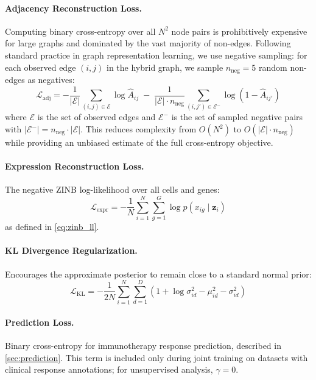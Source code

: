 \documentclass{article}
\newcommand{\KL}{\mathrm{KL}}
\begin{document}
\paragraph{Adjacency Reconstruction Loss.} Computing binary cross-entropy over all $N^2$ node pairs is prohibitively
expensive for large graphs and dominated by the vast majority of non-edges. Following standard practice in graph
representation learning, we use negative sampling: for each observed edge $(i,j)$ in the hybrid graph, we sample
$n_{\text{neg}} = 5$ random non-edges as negatives:
\begin{equation}
    \mathcal{L}_{\text{adj}} = -\frac{1}{|\mathcal{E}|} \sum_{(i,j) \in \mathcal{E}} \log \hat{A}_{ij} \;-\;
\frac{1}{|\mathcal{E}| \cdot n_{\text{neg}}} \sum_{(i,j') \in \mathcal{E}^{-}} \log(1 - \hat{A}_{ij'})
    \label{eq:adj_loss}
\end{equation}
where $\mathcal{E}$ is the set of observed edges and $\mathcal{E}^{-}$ is the set of sampled negative pairs with
$|\mathcal{E}^{-}| = n_{\text{neg}} \cdot |\mathcal{E}|$. This reduces complexity from $O(N^2)$ to $O(|\mathcal{E}| \cdot
n_{\text{neg}})$ while providing an unbiased estimate of the full cross-entropy objective.

\paragraph{Expression Reconstruction Loss.} The negative ZINB log-likelihood over all cells and genes:
\begin{equation}
    \mathcal{L}_{\text{expr}} = -\frac{1}{N} \sum_{i=1}^{N} \sum_{g=1}^{G} \log p(x_{ig} \mid \mathbf{z}_i)
    \label{eq:expr_loss}
\end{equation}
as defined in \cref{eq:zinb_ll}.

\paragraph{KL Divergence Regularization.} Encourages the approximate posterior to remain close to a standard normal prior:
\begin{equation}
    \mathcal{L}_{\KL} = -\frac{1}{2N} \sum_{i=1}^{N} \sum_{d=1}^{D} \left(1 + \log \sigma_{id}^2 - \mu_{id}^2 - \sigma_{id}^2\right)
    \label{eq:kl_loss}
\end{equation}

\paragraph{Prediction Loss.} Binary cross-entropy for immunotherapy response prediction, described in \cref{sec:prediction}. This term is included only during joint training on datasets with clinical response annotations; for unsupervised analysis, $\gamma = 0$.
\end{document}
